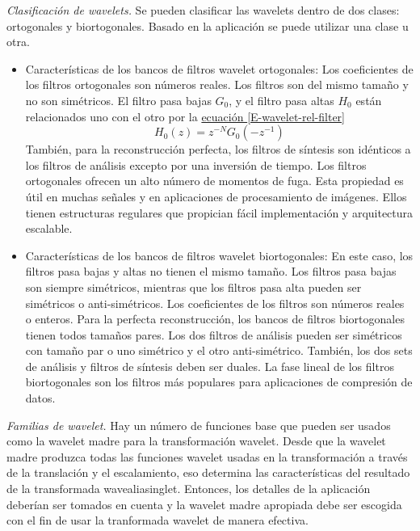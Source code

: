 \documentclass[11pt,lettersize]{article} %
\newcommand{\ecuacion}[1]{\hyperref[{#1}]{ecuación \ref*{#1}}}
\begin{document}
\textit{Clasificación de wavelets.}
Se pueden clasificar las wavelets dentro de dos clases: ortogonales y biortogonales. Basado en la aplicación se puede utilizar una clase u otra. 
\begin{itemize}
	\item Características de los bancos de filtros wavelet ortogonales: 	Los coeficientes de los filtros ortogonales son números reales. Los filtros son del mismo tamaño y no son simétricos. El filtro pasa bajas $G_0$, y el filtro pasa altas $H_0$ están relacionados uno con el
otro por la \ecuacion{E-wavelet-rel-filter}
\begin{equation}
	H_0(z) = z^{-N}G_0(-z^{-1})
	\label{E-wavelet-rel-filter}
\end{equation}
	También, para la reconstrucción perfecta, los filtros de síntesis son idénticos a los filtros de análisis excepto por una inversión de tiempo. Los filtros ortogonales ofrecen un alto número de momentos de fuga. Esta propiedad es útil en muchas señales y en aplicaciones de procesamiento de imágenes. Ellos tienen estructuras regulares que propician fácil implementación y arquitectura escalable.
	\item Características de los bancos de filtros wavelet biortogonales: En este caso, los filtros pasa bajas y altas no tienen el mismo tamaño. Los filtros pasa bajas son siempre simétricos, mientras que los filtros pasa alta pueden ser simétricos o anti-simétricos. Los coeficientes de los filtros son números reales o enteros. Para la perfecta reconstrucción, los bancos de filtros biortogonales tienen todos tamaños pares. Los dos filtros de análisis pueden ser simétricos con tamaño par o uno simétrico y el otro anti-simétrico. También, los dos sets de análisis y filtros de síntesis deben ser duales. La fase lineal de los filtros biortogonales son los filtros más populares para aplicaciones de compresión de datos.\\
\end{itemize}

\textit{Familias de wavelet.}
Hay un número de funciones base que pueden ser usados como la wavelet madre para la transformación wavelet. Desde que la wavelet madre produzca todas las funciones wavelet usadas en la transformación a través de la translación y el escalamiento, eso determina las características del resultado de la transformada wavealiasinglet. Entonces, los detalles de la aplicación deberían ser tomados en cuenta y la wavelet madre apropiada debe ser escogida con el fin de usar la tranformada wavelet de manera efectiva.\\
\end{document}
